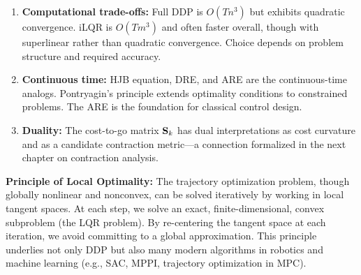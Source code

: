 \begin{enumerate}
\item \textbf{Computational trade-offs:} Full DDP is $O(T n^3)$ but exhibits quadratic convergence. iLQR is $O(T m^3)$
      and often faster overall, though with superlinear rather than quadratic convergence. Choice depends on problem
      structure and required accuracy.

\item \textbf{Continuous time:} HJB equation, DRE, and ARE are the continuous-time analogs. Pontryagin's principle
      extends optimality conditions to constrained problems. The ARE is the foundation for classical control design.

\item \textbf{Duality:} The cost-to-go matrix $\mathbf{S}_k$ has dual interpretations as cost curvature and as a candidate
      contraction metric---a connection formalized in the next chapter on contraction analysis.
\end{enumerate}

\begin{axiombox}
\textbf{Principle of Local Optimality:} The trajectory optimization problem, though globally nonlinear and nonconvex,
can be solved iteratively by working in local tangent spaces. At each step, we solve an exact, finite-dimensional,
convex subproblem (the LQR problem). By re-centering the tangent space at each iteration, we avoid committing to a
global approximation. This principle underlies not only DDP but also many modern algorithms in robotics and machine
learning (e.g., SAC, MPPI, trajectory optimization in MPC).
\end{axiombox}
